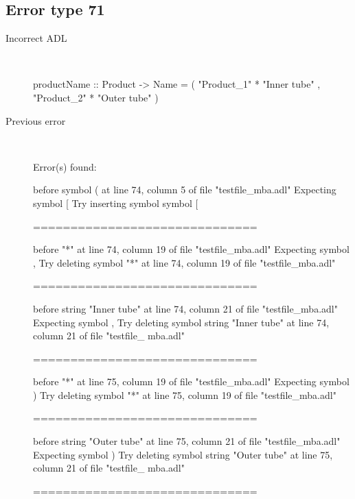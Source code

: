 \hrulefill

\subsection{Error type 71}
  \begin{description}
  \item[Incorrect ADL]~\\
\begin{adl}
productName :: Product -> Name
  = ( "Product_1" * "Inner tube"
    , "Product_2" * "Outer tube"
    )\end{adl}
  \item[Previous error]~\\
\begin{haskell}
Error(s) found:

before symbol ( at line 74, column 5 of file "testfile_mba.adl"
Expecting symbol [
Try inserting symbol symbol [

==============================

before "*" at line 74, column 19 of file "testfile_mba.adl"
Expecting symbol ,
Try deleting symbol "*" at line 74, column 19 of file "testfile_mba.adl"

==============================

before string "Inner tube" at line 74, column 21 of file "testfile_mba.adl"
Expecting symbol ,
Try deleting symbol string "Inner tube" at line 74, column 21 of file "testfile_
mba.adl"

==============================

before "*" at line 75, column 19 of file "testfile_mba.adl"
Expecting symbol )
Try deleting symbol "*" at line 75, column 19 of file "testfile_mba.adl"

==============================

before string "Outer tube" at line 75, column 21 of file "testfile_mba.adl"
Expecting symbol )
Try deleting symbol string "Outer tube" at line 75, column 21 of file "testfile_
mba.adl"

==============================


\end{haskell}
\end{description}
